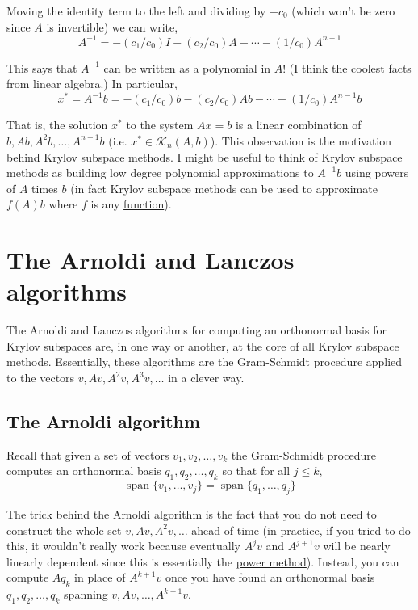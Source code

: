 Moving the identity term to the left and dividing by \(-c_0\) (which
won't be zero since \(A\) is invertible) we can write, \[
A^{-1} = -(c_1/c_0) I - (c_2/c_0) A - \cdots - (1/c_0) A^{n-1}
\]

This says that \(A^{-1}\) can be written as a polynomial in \(A\)! (I
think the coolest facts from linear algebra.) In particular,\\
\[
x^* = A^{-1}b = -(c_1/c_0) b - (c_2/c_0) Ab - \cdots - (1/c_0) A^{n-1}b
\]

That is, the solution \(x^*\) to the system \(Ax = b\) is a linear
combination of \(b, Ab, A^2b, \ldots, A^{n-1}b\) (i.e.
\(x^*\in\mathcal{K}_n(A,b)\)). This observation is the motivation behind
Krylov subspace methods. I might be useful to think of Krylov subspace
methods as building low degree polynomial approximations to \(A^{-1}b\)
using powers of \(A\) times \(b\) (in fact Krylov subspace methods can
be used to approximate \(f(A)b\) where \(f\) is any
\href{./current_research.html}{function}).

\hypertarget{the-arnoldi-and-lanczos-algorithms}{%
\section{The Arnoldi and Lanczos
algorithms}\label{the-arnoldi-and-lanczos-algorithms}}

The Arnoldi and Lanczos algorithms for computing an orthonormal basis
for Krylov subspaces are, in one way or another, at the core of all
Krylov subspace methods. Essentially, these algorithms are the
Gram-Schmidt procedure applied to the vectors \(v,Av,A^2v,A^3v,\ldots\)
in a clever way.

\hypertarget{the-arnoldi-algorithm}{%
\subsection{The Arnoldi algorithm}\label{the-arnoldi-algorithm}}

Recall that given a set of vectors \(v_1,v_2,\ldots, v_k\) the
Gram-Schmidt procedure computes an orthonormal basis
\(q_1,q_2,\ldots,q_k\) so that for all \(j\leq k\), \[
\operatorname{span}\{v_1,\ldots,v_j\} = \operatorname{span}\{q_1,\ldots,q_j\}
\]

The trick behind the Arnoldi algorithm is the fact that you do not need
to construct the whole set \(v,Av,A^2v,\ldots\) ahead of time (in
practice, if you tried to do this, it wouldn't really work because
eventually \(A^jv\) and \(A^{j+1}v\) will be nearly linearly dependent
since this is essentially the
\href{https://en.wikipedia.org/wiki/Power_iteration}{power method}).
Instead, you can compute \(Aq_{k}\) in place of \(A^{k+1}v\) once you
have found an orthonormal basis \(q_1,q_2,\ldots,q_k\) spanning
\(v,Av,\ldots, A^{k-1} v\).

